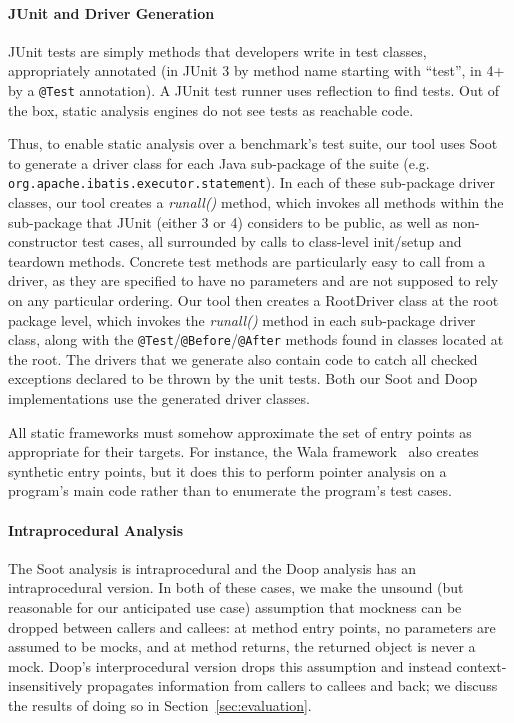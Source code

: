 \paragraph{JUnit and Driver Generation}
JUnit tests are simply methods that developers write in test classes, appropriately annotated (in JUnit 3 by method name starting with ``test'', in 4+ by a \texttt{@Test} annotation). A JUnit test runner uses reflection to find tests. Out of the box, static analysis engines do not see tests as reachable code.


Thus, to enable static analysis over a benchmark's test suite, our tool uses Soot to generate a driver class for each Java sub-package of the suite (e.g. \texttt{org.apache.ibatis.executor.statement}). In each of these sub-package driver classes, our tool creates a \textit{runall()} method, which invokes all methods within the sub-package that JUnit (either 3 or 4) considers to be public, as well as non-constructor test cases, all surrounded by calls to class-level init/setup and teardown methods. Concrete test methods are particularly easy to call from a driver, as they are specified to have no parameters and are not supposed to rely on any particular ordering. 
Our tool then creates a RootDriver class at the root package level, which invokes the \textit{runall()} method in each sub-package driver class, along with the \texttt{@Test}/\texttt{@Before}/\texttt{@After} methods found in classes located at the root. The drivers that we generate also contain code to catch all checked exceptions declared to be thrown by the unit tests. Both our Soot and Doop implementations use the generated driver classes.

All static frameworks must somehow approximate the set of entry points as appropriate for their targets. For instance, the Wala framework~\cite{wala19:_t} also creates synthetic entry points, but it does this to perform pointer analysis on a program's main code rather than to enumerate the program's test cases.

\paragraph{Intraprocedural Analysis} The Soot analysis is intraprocedural and the Doop analysis has an intraprocedural version. In both of these cases, we make the unsound (but reasonable for our anticipated use case) assumption that mockness can be dropped between callers and callees: at method entry points, no parameters are assumed to be mocks, and at method returns, the returned object is never a mock. Doop's interprocedural version drops this assumption and instead context-insensitively propagates information from callers to callees and back; we discuss the results of doing so in Section~\ref{sec:evaluation}.

